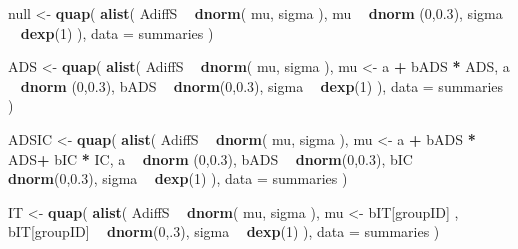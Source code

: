 \documentclass[10pt,dvipsnames,enabledeprecatedfontcommands]{scrartcl}
\newenvironment{Shaded}{\begin{snugshade}}{\end{snugshade}}
\newcommand{\KeywordTok}[1]{\textcolor[rgb]{0.13,0.29,0.53}{\textbf{#1}}}
\newcommand{\DataTypeTok}[1]{\textcolor[rgb]{0.13,0.29,0.53}{#1}}
\newcommand{\DecValTok}[1]{\textcolor[rgb]{0.00,0.00,0.81}{#1}}
\newcommand{\FloatTok}[1]{\textcolor[rgb]{0.00,0.00,0.81}{#1}}
\newcommand{\StringTok}[1]{\textcolor[rgb]{0.31,0.60,0.02}{#1}}
\newcommand{\OperatorTok}[1]{\textcolor[rgb]{0.81,0.36,0.00}{\textbf{#1}}}
\newcommand{\NormalTok}[1]{#1}
\begin{document}
\begin{Shaded}
\begin{Highlighting}[]
\NormalTok{null <-}\StringTok{ }\KeywordTok{quap}\NormalTok{(}
  \KeywordTok{alist}\NormalTok{(}
\NormalTok{    AdiffS }\OperatorTok{~}\StringTok{ }\KeywordTok{dnorm}\NormalTok{( mu, sigma ),}
\NormalTok{    mu }\OperatorTok{~}\StringTok{ }\KeywordTok{dnorm}\NormalTok{ (}\DecValTok{0}\NormalTok{,}\FloatTok{0.3}\NormalTok{),}
\NormalTok{    sigma  }\OperatorTok{~}\StringTok{ }\KeywordTok{dexp}\NormalTok{(}\DecValTok{1}\NormalTok{)}
\NormalTok{  ), }
  \DataTypeTok{data =}\NormalTok{ summaries  }
\NormalTok{)}

\NormalTok{ADS <-}\StringTok{ }\KeywordTok{quap}\NormalTok{(}
  \KeywordTok{alist}\NormalTok{(}
\NormalTok{    AdiffS }\OperatorTok{~}\StringTok{ }\KeywordTok{dnorm}\NormalTok{( mu, sigma ),}
\NormalTok{    mu <-}\StringTok{  }\NormalTok{a }\OperatorTok{+}\StringTok{ }\NormalTok{bADS }\OperatorTok{*}\StringTok{ }\NormalTok{ADS,}
\NormalTok{    a }\OperatorTok{~}\StringTok{ }\KeywordTok{dnorm}\NormalTok{ (}\DecValTok{0}\NormalTok{,}\FloatTok{0.3}\NormalTok{),}
\NormalTok{    bADS }\OperatorTok{~}\StringTok{ }\KeywordTok{dnorm}\NormalTok{(}\DecValTok{0}\NormalTok{,}\FloatTok{0.3}\NormalTok{),}
\NormalTok{    sigma  }\OperatorTok{~}\StringTok{ }\KeywordTok{dexp}\NormalTok{(}\DecValTok{1}\NormalTok{)}
\NormalTok{  ), }
  \DataTypeTok{data =}\NormalTok{ summaries}
\NormalTok{)}

\NormalTok{ADSIC <-}\StringTok{ }\KeywordTok{quap}\NormalTok{(}
  \KeywordTok{alist}\NormalTok{(}
\NormalTok{    AdiffS }\OperatorTok{~}\StringTok{ }\KeywordTok{dnorm}\NormalTok{( mu, sigma ),}
\NormalTok{    mu <-}\StringTok{  }\NormalTok{a }\OperatorTok{+}\StringTok{ }\NormalTok{bADS }\OperatorTok{*}\StringTok{ }\NormalTok{ADS}\OperatorTok{+}\StringTok{ }\NormalTok{bIC }\OperatorTok{*}\StringTok{ }\NormalTok{IC,}
\NormalTok{    a }\OperatorTok{~}\StringTok{ }\KeywordTok{dnorm}\NormalTok{ (}\DecValTok{0}\NormalTok{,}\FloatTok{0.3}\NormalTok{),}
\NormalTok{    bADS }\OperatorTok{~}\StringTok{ }\KeywordTok{dnorm}\NormalTok{(}\DecValTok{0}\NormalTok{,}\FloatTok{0.3}\NormalTok{),}
\NormalTok{    bIC }\OperatorTok{~}\StringTok{ }\KeywordTok{dnorm}\NormalTok{(}\DecValTok{0}\NormalTok{,}\FloatTok{0.3}\NormalTok{),}
\NormalTok{    sigma  }\OperatorTok{~}\StringTok{ }\KeywordTok{dexp}\NormalTok{(}\DecValTok{1}\NormalTok{)}
\NormalTok{  ), }
  \DataTypeTok{data =}\NormalTok{ summaries}
\NormalTok{)}


\NormalTok{IT <-}\StringTok{ }\KeywordTok{quap}\NormalTok{(}
  \KeywordTok{alist}\NormalTok{(}
\NormalTok{    AdiffS }\OperatorTok{~}\StringTok{ }\KeywordTok{dnorm}\NormalTok{( mu, sigma ),}
\NormalTok{    mu <-}\StringTok{  }\NormalTok{bIT[groupID] ,}
\NormalTok{    bIT[groupID] }\OperatorTok{~}\StringTok{ }\KeywordTok{dnorm}\NormalTok{(}\DecValTok{0}\NormalTok{,.}\DecValTok{3}\NormalTok{),}
\NormalTok{    sigma  }\OperatorTok{~}\StringTok{ }\KeywordTok{dexp}\NormalTok{(}\DecValTok{1}\NormalTok{)}
\NormalTok{  ), }
  \DataTypeTok{data =}\NormalTok{ summaries}
\NormalTok{)}



\end{Highlighting}
\end{Shaded}
\end{document}
